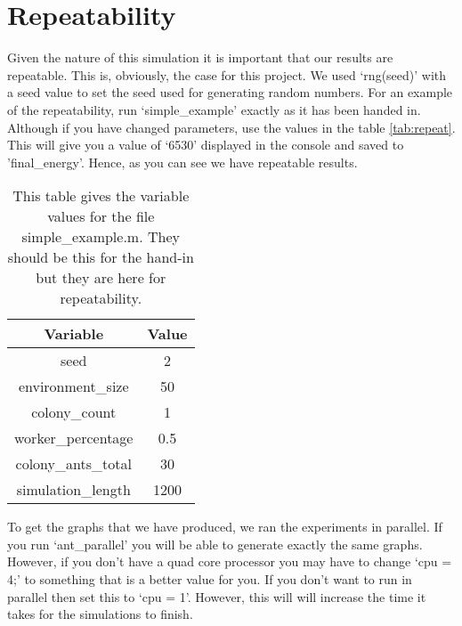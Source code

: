 \section{Repeatability}

Given the nature of this simulation it is important that our results are repeatable. This is, obviously, the case for this project. We used `rng(seed)' with a seed value to set the seed used for generating random numbers. For an example of the repeatability, run `simple\_example' exactly as it has been handed in. Although if you have changed parameters, use the values in the table \ref{tab:repeat}. This will give you a value of `6530' displayed in the console and saved to 'final\_energy'. Hence, as you can see we have repeatable results.\par

\begin{table}[htb]
\centering
\caption{This table gives the variable values for the file simple\_example.m. They should be this for the hand-in but they are here for repeatability.}
\label{repeat}
\begin{tabular}{@{}cc@{}}
\toprule
Variable          & Value \\ \midrule
seed              & 2     \\ \midrule
environment\_size  & 50    \\ \midrule
colony\_count      & 1     \\ \midrule
worker\_percentage & 0.5   \\ \midrule
colony\_ants\_total & 30    \\ \midrule
simulation\_length & 1200  \\ \bottomrule
\end{tabular}
\end{table}


To get the graphs that we have produced, we ran the experiments in parallel. If you run `ant\_parallel' you will be able to generate exactly the same graphs. However, if you don't have a quad core processor you may have to change `cpu = 4;' to something that is a better value for you. If you don't want to run in parallel then set this to `cpu = 1'. However, this will will increase the time it takes for the simulations to finish.\par